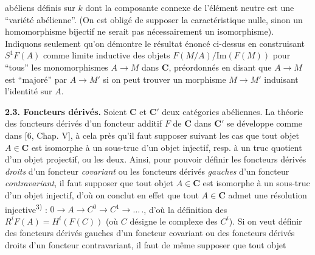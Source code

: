 
\noindent abéliens définis sur $k$ dont la composante connexe de l'élément
neutre est une ``variété abélienne''. (On est obligé de supposer la
caractéristique nulle, sinon un homomorphisme bijectif ne serait pas
nécessairement un isomorphisme). Indiquons seulement qu'on démontre le
résultat énoncé ci-dessus en construisant $S^1F(A)$ comme limite inductive des
objets $F(M/A)/\mathrm{Im}(F(M))$ pour ``tous'' les monomorphismes
$A\to M$ dans $\mathbf{C}$, préordonnés en disant que
$A\to M$ est ``majoré'' par $A\to M'$ si on peut
trouver un morphisme $M\to M'$ induisant l'identité sur $A$.

\indent\textbf{2.3. Foncteurs dérivés.} Soient $\mathbf{C}$ et $\mathbf{C}'$ deux catégories
abéliennes. La théorie des foncteurs dérivés d'un foncteur additif $F$ de $\mathbf{C}$
dans $\mathbf{C}'$ se développe comme dans [6, Chap. V], à cela près qu'il faut supposer
suivant les cas que tout objet $A\in \mathbf{C}$ est isomorphe à un sous-truc d'un objet
injectif, resp. à un truc quotient d'un objet projectif, ou les deux.
Ainsi, pour pouvoir définir les foncteurs dérivés \textit{droits} d'un foncteur
\textit{covariant} ou les foncteurs dérivés \textit{gauches} d'un foncteur
\textit{contravariant}, il faut supposer que tout objet $A\in \mathbf{C}$ est isomorphe
à un sous-truc d'un objet injectif, d'où on conclut en effet que tout $A\in \mathbf{C}$
admet une résolution injective\textsuperscript{3)} :
$0\to A\to C^0\to C^1\to
\ldots\,.$, d'où la définition des
$R^iF(A)=H^i(F(C))$ (où $C$ désigne le complexe des $C^i$). Si on veut définir
des foncteurs dérivés gauches d'un foncteur covariant ou des foncteurs dérivés
droits d'un foncteur contravariant, il faut de même supposer que tout objet
